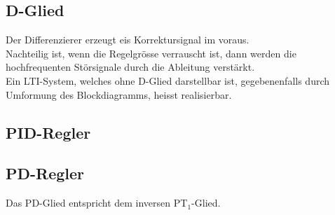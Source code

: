 	
	\subsection{D-Glied }
		Der Differenzierer erzeugt eis Korrektursignal im voraus.\\
		Nachteilig ist, wenn die Regelgrösse verrauscht ist, dann werden die
		hochfrequenten Störsignale durch die Ableitung verstärkt.\\
		Ein LTI-System, welches ohne D-Glied darstellbar ist, gegebenenfalls durch
		Umformung des Blockdiagramms, heisst realisierbar.
	
	
	\subsection{PID-Regler  }
	
	\subsection{PD-Regler  }
	 \qquad
	Das PD-Glied entspricht dem inversen PT$_1$-Glied.
	
